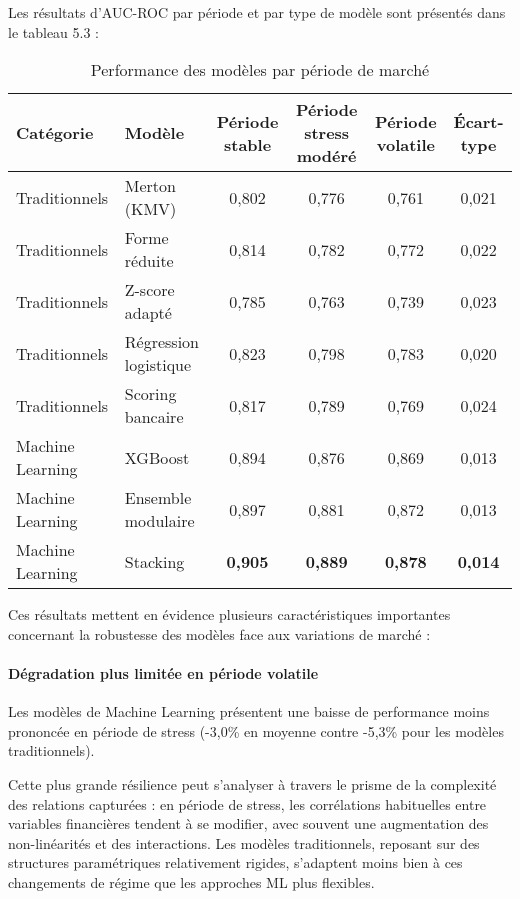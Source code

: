 Les résultats d'AUC-ROC par période et par type de modèle sont présentés dans le tableau 5.3 :

\begin{table}[htbp]
  \centering
  \caption{Performance des modèles par période de marché}
  \begin{tabular}{llcccc}
    \toprule
    \textbf{Catégorie} & \textbf{Modèle} & \textbf{Période stable} & \textbf{Période stress modéré} & \textbf{Période volatile} & \textbf{Écart-type} \\
    \midrule
    Traditionnels & Merton (KMV) & 0,802 & 0,776 & 0,761 & 0,021 \\
    Traditionnels & Forme réduite & 0,814 & 0,782 & 0,772 & 0,022 \\
    Traditionnels & Z-score adapté & 0,785 & 0,763 & 0,739 & 0,023 \\
    Traditionnels & Régression logistique & 0,823 & 0,798 & 0,783 & 0,020 \\
    Traditionnels & Scoring bancaire & 0,817 & 0,789 & 0,769 & 0,024 \\
    Machine Learning & XGBoost & 0,894 & 0,876 & 0,869 & 0,013 \\
    Machine Learning & Ensemble modulaire & 0,897 & 0,881 & 0,872 & 0,013 \\
    Machine Learning & Stacking & \textbf{0,905} & \textbf{0,889} & \textbf{0,878} & \textbf{0,014} \\
    \bottomrule
  \end{tabular}
\end{table}

Ces résultats mettent en évidence plusieurs caractéristiques importantes concernant la robustesse des modèles face aux variations de marché :

\paragraph{Dégradation plus limitée en période volatile} Les modèles de Machine Learning présentent une baisse de performance moins prononcée en période de stress (-3,0\% en moyenne contre -5,3\% pour les modèles traditionnels).

Cette plus grande résilience peut s'analyser à travers le prisme de la complexité des relations capturées : en période de stress, les corrélations habituelles entre variables financières tendent à se modifier, avec souvent une augmentation des non-linéarités et des interactions. Les modèles traditionnels, reposant sur des structures paramétriques relativement rigides, s'adaptent moins bien à ces changements de régime que les approches ML plus flexibles.

